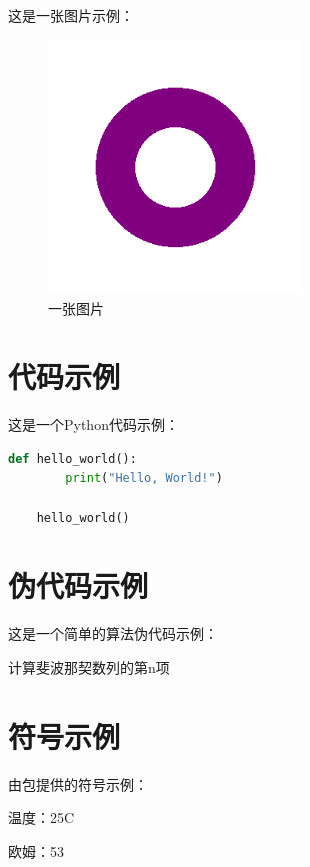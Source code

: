 \documentclass{ranarticle}
\begin{document}
这是一张图片示例：

\begin{figure}[htbp]
    \centering
    \includegraphics[width=0.6\textwidth]{assets/example.png}
    \caption{一张图片}
\end{figure}

\section{代码示例}

这是一个Python代码示例：

\begin{lstlisting}[language=Python]
    def hello_world():
        print("Hello, World!")

    hello_world()
\end{lstlisting}

\section{伪代码示例}

这是一个简单的算法伪代码示例：

\begin{algorithm}[H]
    \caption{计算斐波那契数列的第n项}
\end{algorithm}

\section{符号示例}

由包提供的符号示例：

温度：25\degree C

欧姆：53 \ohm

\printbibliography[title={参考文献}]
\end{document}
